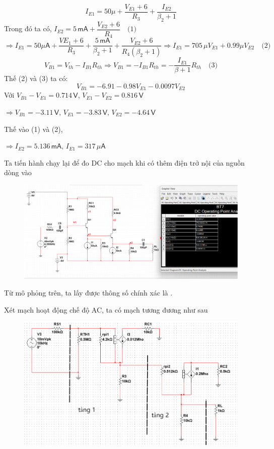 \[ I_{E1} = 50\mu + \dfrac{V_{E1} + 6}{R_{3}} + \dfrac{I_{E2}}{\beta_{2} + 1} \]
Trong đó ta có, $I_{E2} = 5\,\textsf{mA} + \dfrac{V_{E2} + 6}{R_{4}} \quad \text{(1)}$
\[\Rightarrow I_{E1} = 50\mu\textsf{A} + \dfrac{VE_{1} + 6}{R_{3}} + \dfrac{5\,\textsf{mA}}{\beta_{2} + 1} + \dfrac{V_{E2} + 6}{R_{4}(\beta_{2} + 1)} \Rightarrow I_{E1} = 705\,\mu V_{E1} + 0.99\mu V_{E2} \quad \text{(2)}\]
\[ V_{B1} = V_{th} - I_{B1} R_{th} \Rightarrow V_{B1} = -I_{B1}R_{th} = - \dfrac{I_{E1}}{\beta + 1}R_{th} \quad \text{(3)}\]
Thế (2) và (3) ta có:
\[V_{B1} = -6.91 - 0.98V_{E1} - 0.0097V_{E2}\]
Với $V_{B1} - V_{E1} = 0.714\,\textsf{V}$, $V_{E1} - V_{E2} = 0.816\,\textsf{V}$

$\Rightarrow V_{B1} = -3.11 \,\textsf{V}\textsf{, }V_{E1} = -3.83\,\textsf{V} \textsf{, }V_{E2} = -4.64 \,\textsf{V}$ 

\noindent Thế vào (1) và (2),

$\Rightarrow I_{E2} =  5.136 \,\textsf{mA, }I_{E1} = 317\,\mu\textsf{A}$

Ta tiến hành chạy lại để đo DC cho mạch khi có thêm điện trở nội của nguồn dòng vào

\begin{figure}[H]
	\centering
	\includegraphics[width=.9\linewidth]{./my-chapters/my-images/Question7/b_Qnew.png}	
\end{figure}

Từ mô phỏng trên, ta lấy được thông số chính xác là .

Xét mạch hoạt động chế độ AC, ta có mạch tương đương như sau

\begin{figure}[H]
	\centering
	\includegraphics[width=.9\linewidth]{./my-chapters/my-images/Question7/b_machtuongduong.png}
\end{figure}

